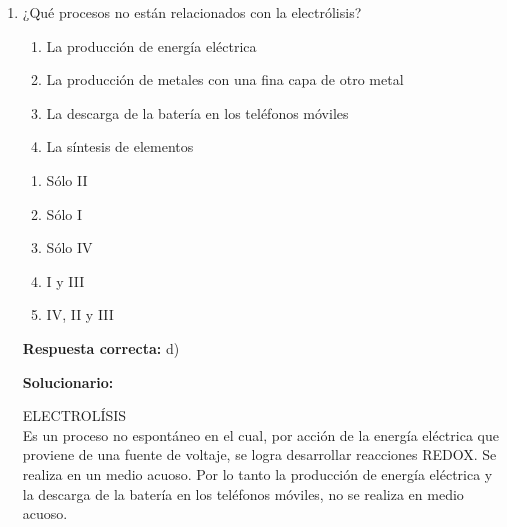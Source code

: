 \begin{enumerate}[resume]
	
	\item ¿Qué procesos no están relacionados con la electrólisis?
	
	\begin{enumerate}[label=\Roman*.]
		\item La producción de energía eléctrica
		\item La producción de metales con una fina capa de otro metal
		\item La descarga de la batería en los teléfonos móviles
		\item La síntesis de elementos 
		
	\end{enumerate}
	
	
	\begin{enumerate}[label=\alph*)]
		\item Sólo II
		\item Sólo I
		\item Sólo IV
		\item I y III
		\item IV, II y III
	\end{enumerate}
	
	\textbf{Respuesta correcta:} d)
	
	\vspace{2mm}
	\textbf{Solucionario:}
	
	ELECTROLÍSIS\\
	Es un proceso no espontáneo en el cual, por acción de la energía eléctrica que proviene de una fuente de voltaje, se logra desarrollar reacciones REDOX. Se realiza en un medio acuoso. Por lo tanto la producción de energía eléctrica y la descarga de la batería en los teléfonos móviles, no se realiza en medio acuoso.
	
	
\end{enumerate}


